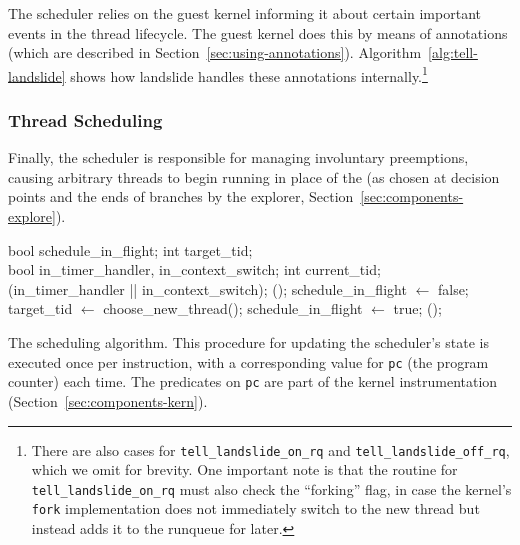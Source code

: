 The scheduler relies on the guest kernel informing it about certain important events in the thread lifecycle. The guest kernel does this by means of annotations (which are described in Section~\ref{sec:using-annotations}). Algorithm~\ref{alg:tell-landslide} shows how landslide handles these annotations internally.\footnote{
There are also cases for \texttt{tell\_landslide\_on\_rq} and \texttt{tell\_landslide\_off\_rq}, which we omit for brevity. One important note is that the routine for \texttt{tell\_landslide\_on\_rq} must also check the ``forking'' flag, in case the kernel's \texttt{fork} implementation does not immediately switch to the new thread but instead adds it to the runqueue for later.}

\subsubsection{Thread Scheduling}
\label{sec:components-inflight}

Finally, the scheduler is responsible for managing involuntary preemptions, causing arbitrary threads to begin running in place of the (as chosen at decision points and the ends of branches by the explorer, Section~\ref{sec:components-explore}).

\begin{algorithm}[t]
	\footnotesize
	\begin{algorithmic}
		\State bool schedule\_in\_flight;
		\State int target\_tid;
		\\
		\State bool in\_timer\_handler, in\_context\_switch;
		\State int current\_tid;
		\\
				(in\_timer\_handler || in\_context\_switch);
						();
					\Else
						\State schedule\_in\_flight $\gets$ false;
					\EndIf
				\EndIf
				\State target\_tid $\gets$ {\sc choose\_new\_thread}();
				\State schedule\_in\_flight $\gets$ true;
				();
			\EndIf
		\EndFunction
	\end{algorithmic}
	\caption{The scheduling algorithm. This procedure for updating the scheduler's state is executed once per instruction, with a corresponding value for \texttt{pc} (the program counter) each time. The predicates on \texttt{pc} are part of the kernel instrumentation (Section~\ref{sec:components-kern}).}
	\label{alg:inflight}
\end{algorithm}

